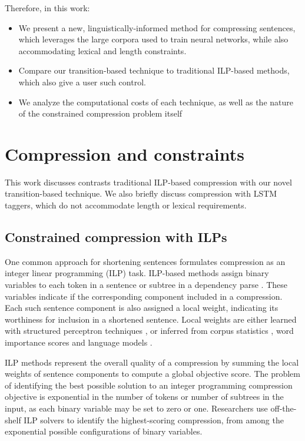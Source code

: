 \documentclass[11pt,a4paper]{article}
\begin{document}
Therefore, in this work:

\begin{itemize}
\item{We present a new, linguistically-informed method for compressing sentences, which leverages the large corpora used to train neural networks, while also accommodating lexical and length constraints.}
\item{Compare our transition-based technique to traditional ILP-based methods, which also give a user such control.}
\item{We analyze the computational costs of each technique, as well as the nature of the constrained compression problem itself}
\end{itemize}


\section{Compression and constraints}

This work discusses contrasts traditional ILP-based compression with our novel transition-based technique. We also briefly discuss compression with LSTM taggers, which do not accommodate length or lexical requirements.

\subsection{Constrained compression with ILPs}\label{s:ilps}

One common approach for shortening sentences formulates compression as an integer linear programming (ILP) task. ILP-based methods assign binary variables to each token in a sentence \cite{clarke2008global} or subtree in a dependency parse \cite{filippova2008dependency}. These variables indicate if the corresponding component included in a compression. Each such sentence component is also assigned a local weight, indicating its worthiness for inclusion in a shortened sentence. Local weights are either learned with structured perceptron techniques \cite{filippova2013overcoming}, or inferred from corpus statistics \cite{filippova2008dependency}, word importance scores and language models \cite{clarke2008global}.

ILP methods represent the overall quality of a compression by summing the local weights of sentence components to compute a global objective score.  The problem of identifying the best possible solution to an integer programming compression objective is exponential in the number of tokens or number of subtrees in the input, as each binary variable may be set to zero or one. Researchers use off-the-shelf ILP solvers to identify the highest-scoring compression, from among the exponential possible configurations of binary variables.
\end{document}
